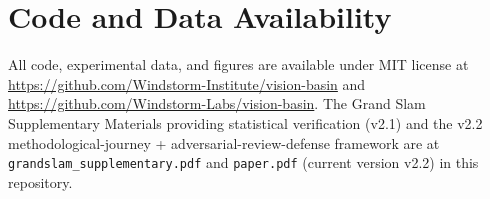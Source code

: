 \documentclass[12pt,a4paper]{article}
\begin{document}
\section*{Code and Data Availability}

All code, experimental data, and figures are available under MIT license at \url{https://github.com/Windstorm-Institute/vision-basin} and \url{https://github.com/Windstorm-Labs/vision-basin}. The Grand Slam Supplementary Materials providing statistical verification (v2.1) and the v2.2 methodological-journey + adversarial-review-defense framework are at \texttt{grandslam\_supplementary.pdf} and \texttt{paper.pdf} (current version v2.2) in this repository.
\end{document}
